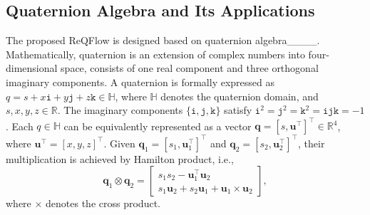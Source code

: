 \subsection{Quaternion Algebra and Its Applications}
The proposed ReQFlow is designed based on quaternion algebra____.
Mathematically, quaternion is an extension of complex numbers into four-dimensional space, consists of one real component and three orthogonal imaginary components. 
A quaternion is formally expressed as $q = s + x\texttt{i} + y\texttt{j} + z\texttt{k} \in \mathbb{H}$, where $\mathbb{H}$ denotes the quaternion domain, and $s, x, y, z \in \mathbb{R}$. 
The imaginary components $\{\texttt{i}, \texttt{j}, \texttt{k}\}$ satisfy $\texttt{i}^2 = \texttt{j}^2 = \texttt{k}^2 = \texttt{ijk} = -1$. 
Each $q\in\mathbb{H}$ can be equivalently represented as a vector $\bm{q} = [s, \bm{u}^\top]^\top\in\mathbb{R}^4$, where $\bm{u}^\top = [x, y, z]^\top$. 
Given $\bm{q}_1 = [s_1, \bm{u}_1^\top]^\top$ and $\bm{q}_2 = [s_2, \bm{u}_2^\top]^\top$, their multiplication is achieved by Hamilton product, i.e., 
\begin{equation}\label{eq:hamilton}
\bm{q}_1 \otimes \bm{q}_2 = 
\begin{bmatrix} 
s_1s_2 - \bm{u}_1^{\top}\bm{u}_2 \\ 
s_1\bm{u}_2 + s_2\bm{u}_1 + \bm{u}_1 \times \bm{u}_2 
\end{bmatrix},
\end{equation}
where $\times$ denotes the cross product. 


